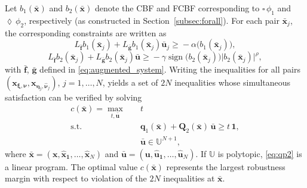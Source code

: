 \documentclass[letterpaper, 10 pt, conference]{ieeeconf}  %
\begin{document}
Let $b_1(\bar{\mathbf{x}})$ and $b_2(\bar{\mathbf{x}})$ denote the CBF and FCBF corresponding to $\square \, \phi_1$ and $\lozenge \, \phi_2$, respectively (as constructed in Section~\ref{subsec:forall}). For each pair $\bar{\mathbf{x}}_j$, the corresponding constraints are written as
\begin{equation*}
    L_{\bar{\mathbf{f}}} b_1(\bar{\mathbf{x}}_j) + L_{\bar{\mathbf{g}}} b_1(\bar{\mathbf{x}}_j) \bar{\mathbf{u}}_j \ge \! -\alpha \big(b_1(\bar{\mathbf{x}}_j)\big),
\end{equation*}
\begin{equation*}
    L_{\bar{\mathbf{f}}} b_2(\bar{\mathbf{x}}_j) + L_{\bar{\mathbf{g}}} b_2(\bar{\mathbf{x}}_j) \bar{\mathbf{u}} \ge \! -\gamma \operatorname{sign} \big( b_2(\bar{\mathbf{x}}_j) \big) \big| b_2(\bar{\mathbf{x}}_j) \big|^\rho,
\end{equation*}
with $\bar{\mathbf{f}}$, $\bar{\mathbf{g}}$ defined in \eqref{eq:augmented_system}. Writing the inequalities for all pairs $(\mathbf{x}_{\boldsymbol{\xi},\boldsymbol{\nu}},  \mathbf{x}_{\boldsymbol{\eta}_j,\hat{\boldsymbol{\nu}}_j})$, $j = 1, \dots, N$, yields a set of $2N$ inequalities whose simultaneous satisfaction can be verified by solving
\begin{equation} \label{eq:qp2}
    \begin{aligned}
        c(\bar{\mathbf{x}}) = \max_{t, \bar{\mathbf{u}}} \quad & t \\[-5pt]
        \text{s.t.} \quad & \mathbf{q}_1(\bar{\mathbf{x}}) + \mathbf{Q}_2(\bar{\mathbf{x}}) \, \bar{\mathbf{u}}
        \ge t \,\mathbf{1}, \\
        & \bar{\mathbf{u}} \in \mathbb{U}^{N+ 1},
    \end{aligned}
\end{equation}
where $\bar{\mathbf{x}} = (\mathbf{x, \hat{\mathbf{x}}_1}, \dots, \hat{\mathbf{x}}_N)$ and $\bar{\mathbf{u}} = (\mathbf{u, \hat{\mathbf{u}}_1}, \dots, \hat{\mathbf{u}}_N)$. If $\mathbb{U}$ is polytopic, \eqref{eq:qp2} is a linear program. The optimal value $c(\bar{\mathbf{x}})$ represents the largest robustness margin with respect to violation of the $2N$ inequalities at $\bar{\mathbf{x}}$.
\end{document}
